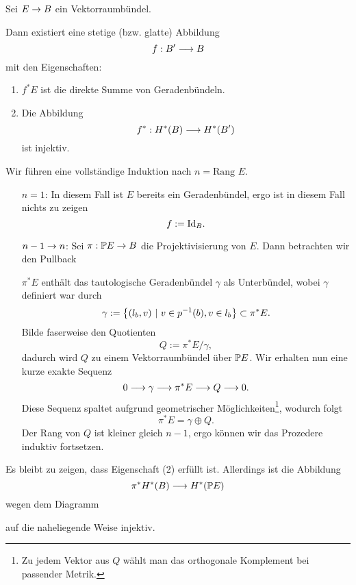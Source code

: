 
Sei $E \pfeil{} B$ ein Vektorraumbündel.

Dann existiert eine stetige (bzw. glatte) Abbildung
\[ f: B' \Pfeil{} B \]
mit den Eigenschaften:
\begin{enumerate}[(1)]
	\item $f^*E $ ist die direkte Summe von Geradenbündeln.
	\item Die Abbildung
	\[ f^* : H^*(B) \Pfeil{} H^*(B') \]
	ist injektiv.
\end{enumerate}

\begin{Beweis}{}
Wir führen eine vollständige Induktion nach $n = \text{Rang } E$.
\begin{enumerate}
	\item[$n = 1$:] In diesem Fall ist $E$ bereits ein Geradenbündel, ergo ist in diesem Fall nichts zu zeigen
	\[ f:= \id{B}. \]
	\item[$n- 1 \pfeil{} n$:] Sei $\pi : \P E \pfeil{} B$ die Projektivisierung von $E$. Dann betrachten wir den Pullback
	\begin{center}
	\end{center}
$\pi^*E$ enthält das tautologische Geradenbündel $\gamma$ als Unterbündel, wobei $\gamma$ definiert war durch
\[ \gamma := \set{(l_b, v)}{ v \in p\i(b), v \in l_b } \subset \pi^*E. \]
Bilde faserweise den Quotienten
\[ Q := \pi^*E/ \gamma, \]
dadurch wird $Q$ zu einem Vektorraumbündel über $\P E$. Wir erhalten nun eine kurze exakte Sequenz
\[ 0 \Pfeil{} \gamma \Pfeil{} \pi^*E \Pfeil{} Q \Pfeil{} 0. \]
Diese Sequenz spaltet aufgrund geometrischer Möglichkeiten\footnote{Zu jedem Vektor aus $Q$ wählt man das orthogonale Komplement bei passender Metrik.}, wodurch folgt
\[ \pi^* E = \gamma \oplus Q. \]
Der Rang von $Q$ ist kleiner gleich $n-1$, ergo können wir das Prozedere induktiv fortsetzen.
\end{enumerate}
Es bleibt zu zeigen, dass Eigenschaft (2) erfüllt ist. Allerdings ist die Abbildung
\[ \pi^* H^*(B) \Pfeil{} H^*(\P E) \]
wegen dem Diagramm
\begin{center}
\end{center}
auf die naheliegende Weise injektiv.
\end{Beweis}

